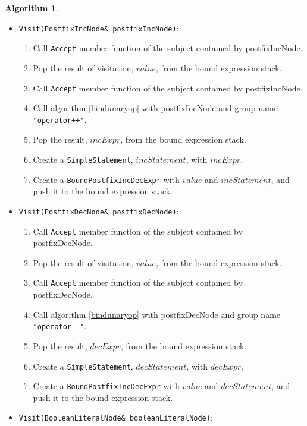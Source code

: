 \documentclass[a4paper,oneside,11pt]{book}
\theoremstyle{definition}
\newtheorem{algo}{Algorithm}[section]
\begin{document}
\begin{algo}
\begin{itemize}
\verb|Visit(DerefNode& derefNode)|:\\
Calls algorithm \ref{bindunaryop} with derefNode and group name \verb|"operator*"|.\\
\item
\verb|Visit(PostfixIncNode& postfixIncNode)|:\\
\begin{enumerate}
\item
Call \verb|Accept| member function of the subject contained by postfixIncNode.
\item
Pop the result of visitation, $value$, from the bound expression stack.
\item
Call \verb|Accept| member function of the subject contained by postfixIncNode.
\item
Call algorithm \ref{bindunaryop} with postfixIncNode and group name \verb|"operator++"|.\\
\item
Pop the result, $incExpr$, from the bound expression stack.
\item
Create a \verb|SimpleStatement|, $incStatement$, with $incExpr$.
\item
Create a \verb|BoundPostfixIncDecExpr| with $value$ and $incStatement$, and push it to the bound expression stack.
\end{enumerate}
\item
\verb|Visit(PostfixDecNode& postfixDecNode)|:\\
\begin{enumerate}
\item
Call \verb|Accept| member function of the subject contained by postfixDecNode.
\item
Pop the result of visitation, $value$, from the bound expression stack.
\item
Call \verb|Accept| member function of the subject contained by postfixDecNode.
\item
Call algorithm \ref{bindunaryop} with postfixDecNode and group name \verb|"operator--"|.\\
\item
Pop the result, $decExpr$, from the bound expression stack.
\item
Create a \verb|SimpleStatement|, $decStatement$, with $decExpr$.
\item
Create a \verb|BoundPostfixIncDecExpr| with $value$ and $decStatement$, and push it to the bound expression stack.
\end{enumerate}
\item
\verb|Visit(BooleanLiteralNode& booleanLiteralNode)|:

\end{itemize}
\end{algo}
\end{document}
